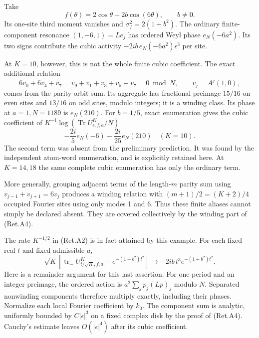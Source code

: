 Take
\[
 f(\theta)=2\cos\theta+2b\cos(6\theta),\qquad b\ne0.
\]
Its one-site third moment vanishes and \(\sigma_f^2=2(1+b^2)\).
The ordinary finite-component resonance \((1,-6,1)=Le_j\)
has ordered Weyl phase \(e_N(-6a^2)\).
Its two signs contribute the cubic activity
\(-2ib\,e_N(-6a^2)\epsilon^3\) per site.

At \(K=10\), however, this is not the whole finite cubic coefficient.
The exact additional relation
\[
 6v_0+6v_4+v_7
       =v_9+v_1+v_3+v_5+v_7=0\bmod N,\qquad v_j=A^j(1,0),
\]
comes from the parity-orbit sum.
Its aggregate has fractional preimage \(15/16\) on even sites and
\(13/16\) on odd sites, modulo integers; it is a winding class.
Its phase at \(a=1,N=1189\) is \(e_N(210)\).
For \(b=1/5\), exact enumeration gives the cubic coefficient of
\(K^{-1}\log(\operatorname{Tr}U_{\epsilon,f,a}^{K}/N)\)
\[
             -\frac{2i}{5}e_N(-6)-\frac{2i}{25}e_N(210)
                        \quad(K=10).                      \tag{Ret.A14}
\]
The second term was absent from the preliminary prediction.
It was found by the independent atom-word enumeration, and is explicitly
retained here. At \(K=14,18\) the same complete cubic enumeration has only
the ordinary term.

More generally, grouping adjacent terms of the length-\(m\) parity sum
using \(v_{j-1}+v_{j+1}=6v_j\) produces a winding relation with
\((m+1)/2=(K+2)/4\) occupied Fourier sites using only modes 1 and 6.
Thus these finite aliases cannot simply be declared absent.
They are covered collectively by the winding part of (Ret.A4).

The rate \(K^{-1/2}\) in (Ret.A2) is in fact attained by this example.
For each fixed real \(t\) and fixed admissible \(a\),
\[
 \sqrt K\left[
 \operatorname{tr}_-U_{t/\sqrt K,f,a}^{K}
                         -e^{-(1+b^2)t^2}\right]
          \longrightarrow-2ib\,t^3e^{-(1+b^2)t^2}.          \tag{Ret.A15}
\]
Here is a remainder argument for this last assertion.
For one period and an integer preimage, the ordered action is
\(a^2\sum_jp_j(Lp)_j\) modulo \(N\).
Separated nonwinding components therefore multiply exactly, including
their phases. Normalize each local Fourier coefficient by \(k_0\).
The component sum is analytic, uniformly bounded by \(C|\epsilon|^3\)
on a fixed complex disk by the proof of (Ret.A4).
Cauchy's estimate leaves \(O(|\epsilon|^4)\) after its cubic coefficient.

